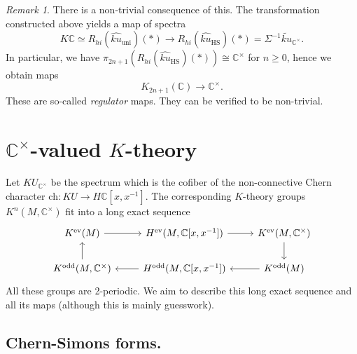 \documentclass[a4paper]{book}
\newcommand{\bC}{\mathbb{C}}
\newcommand{\ch}{\mathrm{ch}}
\theoremstyle{definition}
\theoremstyle{remark}
\newtheorem{remark}[equation]{Remark}
\numberwithin{equation}{section}
\begin{document}
\begin{remark}
There is a non-trivial consequence of this. The transformation constructed above yields a map of spectra
\[
K\bC \simeq R_{hi}(\widehat{ku}_{\mathrm{uni}})(*) \longrightarrow R_{hi}(\widehat{ku}_{\mathrm{HS}})(*) = \Sigma^{-1}\widetilde{ku}_{\bC^\times}.
\]
In particular, we have $\pi_{2n+1}(R_{hi}(\widehat{ku}_{\mathrm{HS}})(*)) \cong \bC^\times$ for $n \geq 0$, hence we obtain maps
\[
K_{2n+1}(\bC) \longrightarrow \bC^\times.
\]
These are so-called \emph{regulator} maps. They can be verified to be non-trivial.
\end{remark}

\section{\texorpdfstring{$\bC^\times$}{C}-valued \texorpdfstring{$K$}{K}-theory}
Let $KU_{\bC^\times}$ be the spectrum which is the cofiber of the non-connective Chern character $\ch : KU \longrightarrow H\bC[x, x^{-1}]$. The corresponding $K$-theory groups $K^n(M, \bC^\times)$ fit into a long exact sequence
\[
\begin{tikzcd}
K^{\mathrm{ev}}(M) \ar[r]
& 
H^{\mathrm{ev}}(M, \bC[x, x^{-1}])
\ar[r]
&
K^{\mathrm{ev}}(M, \bC^\times)
\ar[d]
\\
K^{\mathrm{odd}}(M, \bC^\times) \ar[u] & H^{\mathrm{odd}}(M, \bC[x, x^{-1}]) \ar[l]& K^{\mathrm{odd}}(M) 
\ar[l]
\end{tikzcd}
\]
All these groups are 2-periodic. We aim to describe this long exact sequence and all its maps (although this is mainly guesswork).

\subsection{Chern-Simons forms.}
\end{document}
